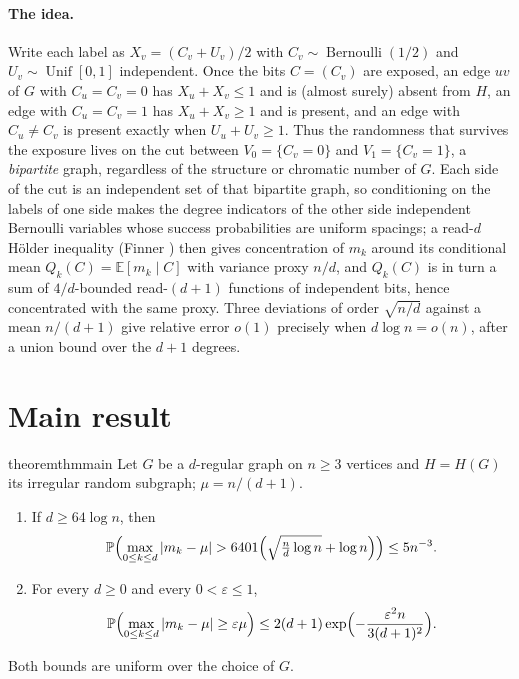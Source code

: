 \documentclass[11pt,a4paper]{article}
\theoremstyle{plain}
\theoremstyle{definition}
\theoremstyle{remark}
\newcommand{\EE}{\mathbb E}
\newcommand{\PP}{\mathbb P}
\newcommand{\Unif}{\operatorname{Unif}}
\newcommand{\Ber}{\operatorname{Bernoulli}}
\begin{document}
\paragraph{The idea.} Write each label as $X_v=(C_v+U_v)/2$ with $C_v\sim\Ber(1/2)$ and $U_v\sim\Unif[0,1]$ independent. Once the bits $C=(C_v)$ are exposed, an edge $uv$ of $G$ with $C_u=C_v=0$ has $X_u+X_v\le1$ and is (almost surely) absent from $H$, an edge with $C_u=C_v=1$ has $X_u+X_v\ge1$ and is present, and an edge with $C_u\ne C_v$ is present exactly when $U_u+U_v\ge1$. Thus the randomness that survives the exposure lives on the cut between $V_0=\{C_v=0\}$ and $V_1=\{C_v=1\}$, a \emph{bipartite} graph, regardless of the structure or chromatic number of $G$. Each side of the cut is an independent set of that bipartite graph, so conditioning on the labels of one side makes the degree indicators of the other side independent Bernoulli variables whose success probabilities are uniform spacings; a read-$d$ H\"older inequality (Finner \cite{Finner92}) then gives concentration of $m_k$ around its conditional mean $Q_k(C)=\EE[m_k\mid C]$ with variance proxy $n/d$, and $Q_k(C)$ is in turn a sum of $4/d$-bounded read-$(d+1)$ functions of independent bits, hence concentrated with the same proxy. Three deviations of order $\sqrt{n/d}$ against a mean $n/(d+1)$ give relative error $o(1)$ precisely when $d\log n=o(n)$, after a union bound over the $d+1$ degrees.

\section{Main result}\label{sec:main}

\begin{restatable}{theorem}{thmmain}\label{thm:main}
Let $G$ be a $d$-regular graph on $n\ge3$ vertices and $H=H(G)$ its irregular random subgraph; $\mu=n/(d+1)$.
\begin{enumerate}[label=\textup{(\roman*)},itemsep=2pt]
\item\label{it:large} If $d\ge64\log n$, then
\[
 \PP\Bigl(\max_{0\le k\le d}|m_k-\mu|>6401\Bigl(\sqrt{\tfrac nd\log n}+\log n\Bigr)\Bigr)\le 5n^{-3}.
\]
\item\label{it:small} For every $d\ge0$ and every $0<\varepsilon\le1$,
\[
 \PP\Bigl(\max_{0\le k\le d}|m_k-\mu|\ge\varepsilon\mu\Bigr)\le 2(d+1)\exp\Bigl(-\frac{\varepsilon^2n}{3(d+1)^2}\Bigr).
\]
\end{enumerate}
Both bounds are uniform over the choice of $G$.
\end{restatable}
\end{document}
